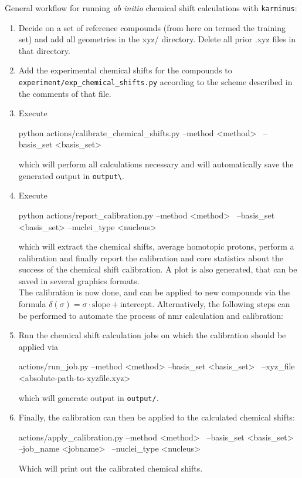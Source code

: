 \documentclass[10pt,a4paper]{article}
\renewcommand{\familydefault}{\sfdefault}
\begin{document}
\renewcommand{\familydefault}{\sfdefault}

General workflow for running \textit{ab initio} chemical shift calculations
with \texttt{karminus}:
\begin{enumerate}
\item Decide on a set of reference compounds (from here on termed the training set) and add all geometries 
in the xyz/ directory. Delete all prior .xyz files in that directory.
\item Add the experimental chemical shifts for the compounds to\newline
\verb!experiment/exp_chemical_shifts.py! according
to the scheme described in the comments of that file.
\item Execute
\begin{code}
python actions/calibrate_chemical_shifts.py --method <method> \
  --basis_set <basis_set>
\end{code}
which will perform all calculations necessary and will automatically save the generated output in \verb!output\!.
\item Execute
\begin{code}
python actions/report_calibration.py --method <method> \
  --basis_set <basis_set> --nuclei_type <nucleus>
\end{code}
which will extract the chemical shifts, average homotopic protons, perform a calibration and finally report the calibration and core statistics about the success of the chemical shift calibration.
A plot is also generated, that can be saved in several graphics formats.\\
The calibration is now done, and can be applied to new compounds via the formula
	$\delta (\sigma) = \sigma \cdot \text{slope} + \text{intercept}$.
Alternatively, the following steps can be performed to automate the process of nmr calculation and calibration:
\item Run the chemical shift calculation jobs on which the
calibration should be applied via
\begin{code}
actions/run_job.py --method <method> --basis_set <basis_set> \
  --xyz_file <absolute-path-to-xyzfile.xyz>
\end{code}
which will generate output in \verb!output/!.
\item Finally, the calibration can then be applied to the calculated chemical shifts:
\begin{code}
actions/apply_calibration.py --method <method> \
  --basis_set <basis_set> --job_name <jobname> \
  --nuclei_type <nucleus>
\end{code}
Which will print out the calibrated chemical shifts.
\end{enumerate}
\end{document}
